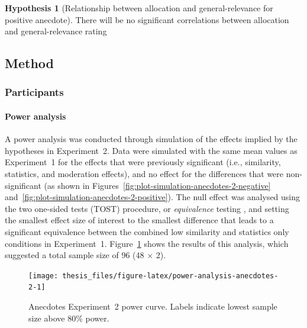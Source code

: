\documentclass[a4paper, nobind, dvipsnames]{templates/ociamthesis}
\theoremstyle{definition}
\theoremstyle{definition}
\theoremstyle{definition}
\theoremstyle{definition}
\newtheorem{hypothesis}{Hypothesis}[chapter]
\theoremstyle{remark}
\begin{document}
\begin{hypothesis}[Relationship between allocation and general-relevance for positive anecdote]
\protect\hypertarget{hyp:allocation-general-relevance-anecdotes-2}{}{\label{hyp:allocation-general-relevance-anecdotes-2} {} }There will be no significant correlations between allocation and
general-relevance rating
\end{hypothesis}

\subsection{Method}

\subsubsection{Participants}

\hypertarget{power-analysis-anecdotes-2}{%
\paragraph{Power analysis}\label{power-analysis-anecdotes-2}}

A power analysis was conducted through simulation of the effects implied by the
hypotheses in Experiment~2. Data were simulated with the same mean values as
Experiment~1 for the effects that were previously significant (i.e., similarity,
statistics, and moderation effects), and no effect for the differences that were
non-significant (as shown in
Figures~\ref{fig:plot-simulation-anecdotes-2-negative}
and~\ref{fig:plot-simulation-anecdotes-2-positive}). The null effect was
analysed using the two one-sided tests (TOST) procedure, or \emph{equivalence}
testing \autocite{lakens2018}, and setting the smallest effect size of interest to the
smallest difference that leads to a significant equivalence between the combined
low similarity and statistics only conditions in Experiment~1.
Figure~\ref{fig:power-analysis-anecdotes-2} shows the results of this analysis,
which suggested a total sample size of 96
(48 \(\times\) 2).

\newpage

\begin{landscape}



\begin{figure}
\texttt{[image: thesis\_files/figure-latex/power-analysis-anecdotes-2-1]} \caption{Anecdotes Experiment~2 power curve. Labels indicate lowest sample size above 80\% power.}\label{fig:power-analysis-anecdotes-2}
\end{figure}

\end{landscape}
\end{document}
